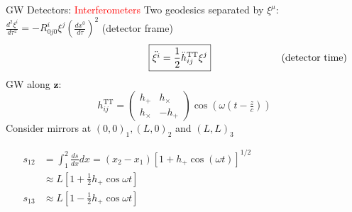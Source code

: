 \documentclass[xcolor=dvipsnames,handout,t]{beamer}
\newcommand{\red}[1]{\textcolor{red}{#1}}
\begin{document}
 \begin{frame}{GW Detectors: \red{Interferometers}}
  Two geodesics separated by $\xi^\mu$:
$ \tfrac{d^2 \xi^i}{d\tau^2} = -R^i_{0j0} \xi^j\left(\tfrac{dx^0}{d\tau}\right)^2$ \hfill (detector frame)\\
\vspace{-3mm}
\[
\hspace{4.5cm} \boxed{\ddot{\xi^i} = \frac{1}{2} \ddot{h}_{ij}^\text{TT} \xi^j} \hspace{2.5cm} \text{(detector time)}
\]
%
%
GW along $\mathbf{z}$: 
\[
 h_{ij}^\text{TT} = \left(\begin{array}{cc}
                           h_+ & h_\times \\
                           h_\times & - h_+
                          \end{array}\right) \cos\left(\omega\left( t-\tfrac{z}{c}\right)\right)
\]
Consider mirrors at $(0,0)_1, (L,0)_2$ and $(L,L)_3$
\begin{small}
\begin{align*}
  s_{12} &= \int_1^2 \tfrac{ds}{dx}dx = (x_2-x_1) \left[ 1 + h_+ \cos(\omega t)\right]^{1/2}\hspace{4cm} \\
			      & \approx L \left[ 1+\tfrac{1}{2} h_+ \cos\omega t \right] \\
s_{13} &\approx L \left[ 1-\tfrac{1}{2} h_+ \cos\omega t \right]
\end{align*}
\end{small}
%
 \end{frame}
 
 
\end{document}
